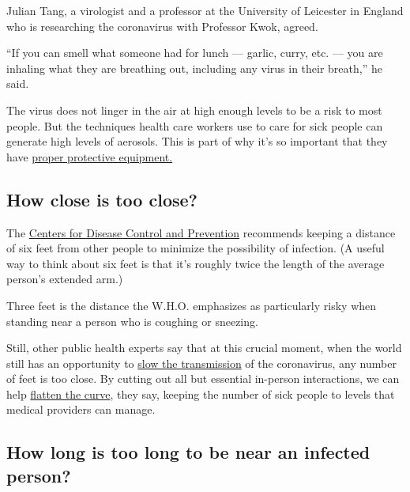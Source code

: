 Julian Tang, a virologist and a professor at the University of Leicester
in England who is researching the coronavirus with Professor Kwok,
agreed.

``If you can smell what someone had for lunch --- garlic, curry, etc.
--- you are inhaling what they are breathing out, including any virus in
their breath,'' he said.

The virus does not linger in the air at high enough levels to be a risk
to most people. But the techniques health care workers use to care for
sick people can generate high levels of aerosols. This is part of why
it's so important that they have
\href{https://www.nytimes3xbfgragh.onion/interactive/2020/03/11/us/virus-health-workers.html}{proper
protective equipment.}

\hypertarget{how-close-is-too-close}{%
\subsection{How close is too close?}\label{how-close-is-too-close}}

The
\href{https://www.cdc.gov/coronavirus/2019-ncov/hcp/clinical-criteria.html}{Centers
for Disease Control and Prevention} recommends keeping a distance of six
feet from other people to minimize the possibility of infection. (A
useful way to think about six feet is that it's roughly twice the length
of the average person's extended arm.)

Three feet is the distance the W.H.O. emphasizes as particularly risky
when standing near a person who is coughing or sneezing.

Still, other public health experts say that at this crucial moment, when
the world still has an opportunity to
\href{https://www.nytimes3xbfgragh.onion/interactive/2020/03/19/world/coronavirus-flatten-the-curve-countries.html}{slow
the transmission} of the coronavirus, any number of feet is too close.
By cutting out all but essential in-person interactions, we can help
\href{https://www.nytimes3xbfgragh.onion/2020/03/11/science/coronavirus-curve-mitigation-infection.html}{flatten
the curve}, they say, keeping the number of sick people to levels that
medical providers can manage.

\hypertarget{how-long-is-too-long-to-be-near-an-infected-person}{%
\subsection{How long is too long to be near an infected
person?}\label{how-long-is-too-long-to-be-near-an-infected-person}}

